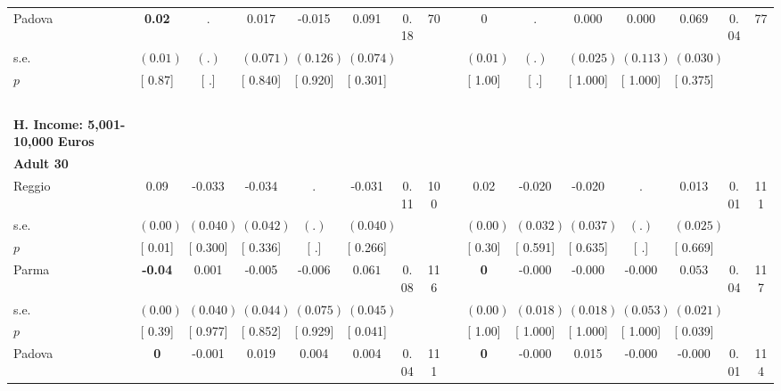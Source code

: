 \begin{longtable}{L{8em} c c c c c c c p{1em} c c c c c c c}
\quad \quad \quad Padova& \textbf{     0.02} &         . &     0.017 &    -0.015 &     0.091 &      0.18 &        70 & & 0 &         . &     0.000 &     0.000 &     0.069 &      0.04 &        77  \\*
\quad \quad \quad \quad s.e.& $ (     0.01)$ & $ (        .)$ & $ (    0.071)$ & $ (    0.126)$ & $ (    0.074)$ & & & & $ (     0.01)$ & $ (        .)$ & $ (    0.025)$ & $ (    0.113)$ & $ (    0.030)$ & &  \\*
\quad \quad \quad \quad $ p$ & [     0.87] & [        .] & [    0.840] & [    0.920] & [    0.301] & & & & [     1.00] & [        .] & [    1.000] & [    1.000] & [    0.375] & &  \\[1em]
~\\[1em]
\textbf{H. Income: 5,001-10,000 Euros} \\*
\quad \quad \textbf{Adult 30} & & & & & & & & & & & & & & & \\* 
\quad \quad \quad Reggio& 0.09 &    -0.033 &    -0.034 &         . &    -0.031 &      0.11 &       100 & & 0.02 &    -0.020 &    -0.020 &         . &     0.013 &      0.01 &       111  \\*
\quad \quad \quad \quad s.e.& $ (     0.00)$ & $ (    0.040)$ & $ (    0.042)$ & $ (        .)$ & $ (    0.040)$ & & & & $ (     0.00)$ & $ (    0.032)$ & $ (    0.037)$ & $ (        .)$ & $ (    0.025)$ & &  \\*
\quad \quad \quad \quad $ p$ & [     0.01] & [    0.300] & [    0.336] & [        .] & [    0.266] & & & & [     0.30] & [    0.591] & [    0.635] & [        .] & [    0.669] & &  \\[1em]
\quad \quad \quad Parma& \textbf{    -0.04} &     0.001 &    -0.005 &    -0.006 & $ \mathbf{    0.061}$ &      0.08 &       116 & & \textbf{0} &    -0.000 &    -0.000 &    -0.000 & $ \mathbf{    0.053}$ &      0.04 &       117  \\*
\quad \quad \quad \quad s.e.& $ (     0.00)$ & $ (    0.040)$ & $ (    0.044)$ & $ (    0.075)$ & $ (    0.045)$ & & & & $ (     0.00)$ & $ (    0.018)$ & $ (    0.018)$ & $ (    0.053)$ & $ (    0.021)$ & &  \\*
\quad \quad \quad \quad $ p$ & [     0.39] & [    0.977] & [    0.852] & [    0.929] & [    0.041] & & & & [     1.00] & [    1.000] & [    1.000] & [    1.000] & [    0.039] & &  \\[1em]
\quad \quad \quad Padova& \textbf{0} &    -0.001 &     0.019 &     0.004 &     0.004 &      0.04 &       111 & & \textbf{0} &    -0.000 &     0.015 &    -0.000 &    -0.000 &      0.01 &       114  \\*

\end{longtable}
